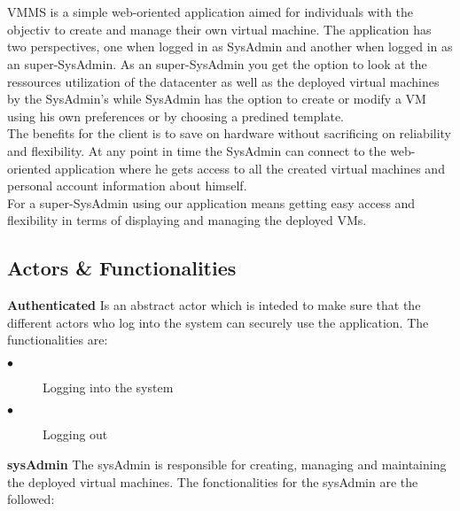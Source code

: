 \section{\mysystemname}

VMMS is a simple web-oriented application aimed for individuals with the
objectiv to create and manage their own virtual machine. The application    
has two perspectives, one when logged in as SysAdmin and another when
logged in as an super-SysAdmin. As an super-SysAdmin you get the option to look
at the ressources utilization of the datacenter as well as the deployed virtual
machines by the SysAdmin's while SysAdmin has the option to create or modify 
a VM using his own preferences or by choosing a predined template.\\The benefits
for the client is to save on hardware without sacrificing on reliability and 
flexibility. At any point in time the SysAdmin can connect to the web-oriented
application where he gets access to all the created virtual machines and
personal account information about himself.\\For a super-SysAdmin using our
application means getting easy access and flexibility in terms of displaying and
managing the deployed VMs.

\subsection{Actors \& Functionalities}



\textbf{Authenticated} Is an abstract actor which is inteded to make sure that
the different actors who log into the system can securely use the application. 
The functionalities are:

\begin{description}

\item[$\bullet$] Logging into the system
\item[$\bullet$] Logging out
\end{description}
\textbf{sysAdmin} The sysAdmin is responsible for creating, managing and
maintaining the deployed virtual machines. The fonctionalities for the sysAdmin 
are the followed:

